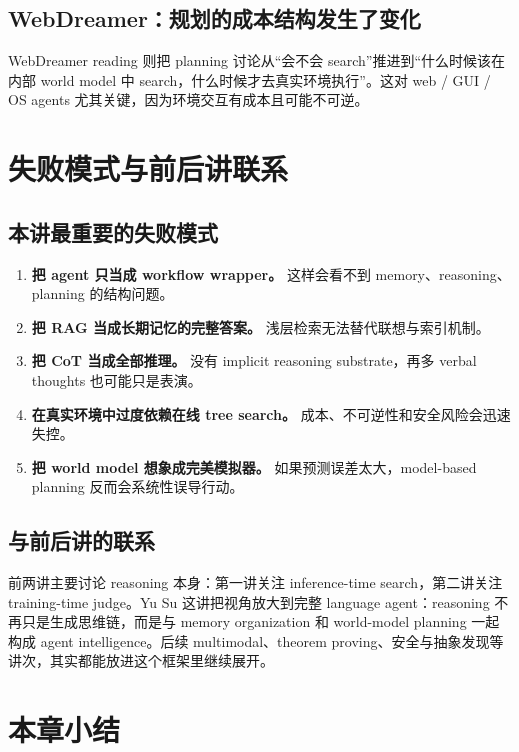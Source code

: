 \subsection{WebDreamer：规划的成本结构发生了变化}

WebDreamer reading 则把 planning 讨论从“会不会 search”推进到“什么时候该在内部 world model 中 search，什么时候才去真实环境执行”。这对 web / GUI / OS agents 尤其关键，因为环境交互有成本且可能不可逆。

\section{失败模式与前后讲联系}

\subsection{本讲最重要的失败模式}

\begin{enumerate}
\item \textbf{把 agent 只当成 workflow wrapper。} 这样会看不到 memory、reasoning、planning 的结构问题。
\item \textbf{把 RAG 当成长期记忆的完整答案。} 浅层检索无法替代联想与索引机制。
\item \textbf{把 CoT 当成全部推理。} 没有 implicit reasoning substrate，再多 verbal thoughts 也可能只是表演。
\item \textbf{在真实环境中过度依赖在线 tree search。} 成本、不可逆性和安全风险会迅速失控。
\item \textbf{把 world model 想象成完美模拟器。} 如果预测误差太大，model-based planning 反而会系统性误导行动。
\end{enumerate}

\subsection{与前后讲的联系}

前两讲主要讨论 reasoning 本身：第一讲关注 inference-time search，第二讲关注 training-time judge。Yu Su 这讲把视角放大到完整 language agent：reasoning 不再只是生成思维链，而是与 memory organization 和 world-model planning 一起构成 agent intelligence。后续 multimodal、theorem proving、安全与抽象发现等讲次，其实都能放进这个框架里继续展开。

\section{本章小结}


